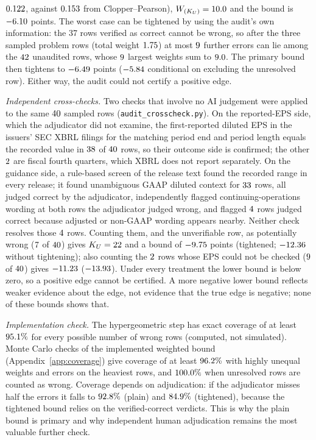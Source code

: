 \documentclass[journal]{IEEEtran}
\theoremstyle{definition}
\begin{document}
$0.122$, against $0.153$ from Clopper--Pearson), $W_{(K_U)}=10.0$ and the bound is $-6.10$ points. The worst case can be tightened by using the audit's own information: the 37 rows verified as correct cannot be wrong, so after the three sampled problem rows (total weight $1.75$) at most $9$ further errors can lie among the $42$ unaudited rows, whose $9$ largest weights sum to $9.0$. The primary bound then tightens to $-6.49$ points ($-5.84$ conditional on excluding the unresolved row). Either way, the audit could not certify a positive edge.

\emph{Independent cross-checks.} Two checks that involve no AI judgement were applied to the same $40$ sampled rows (\texttt{audit\_crosscheck.py}). On the reported-EPS side, which the adjudicator did not examine, the first-reported diluted EPS in the issuers' SEC XBRL filings for the matching period end and period length equals the recorded value in $38$ of $40$ rows, so their outcome side is confirmed; the other $2$ are fiscal fourth quarters, which XBRL does not report separately. On the guidance side, a rule-based screen of the release text found the recorded range in every release; it found unambiguous GAAP diluted context for $33$ rows, all judged correct by the adjudicator, independently flagged continuing-operations wording at both rows the adjudicator judged wrong, and flagged $4$ rows judged correct because adjusted or non-GAAP wording appears nearby. Neither check resolves those $4$ rows. Counting them, and the unverifiable row, as potentially wrong ($7$ of $40$) gives $K_U=22$ and a bound of $-9.75$ points (tightened; $-12.36$ without tightening); also counting the $2$ rows whose EPS could not be checked ($9$ of $40$) gives $-11.23$ ($-13.93$). Under every treatment the lower bound is below zero, so a positive edge cannot be certified. A more negative lower bound reflects weaker evidence about the edge, not evidence that the true edge is negative; none of these bounds shows that.

\emph{Implementation check.} The hypergeometric step has exact coverage of at least $95.1\%$ for every possible number of wrong rows (computed, not simulated). Monte Carlo checks of the implemented weighted bound (Appendix~\ref{app:coverage}) give coverage of at least $96.2\%$ with highly unequal weights and errors on the heaviest rows, and $100.0\%$ when unresolved rows are counted as wrong. Coverage depends on adjudication: if the adjudicator misses half the errors it falls to $92.8\%$ (plain) and $84.9\%$ (tightened), because the tightened bound relies on the verified-correct verdicts. This is why the plain bound is primary and why independent human adjudication remains the most valuable further check.
\end{document}
